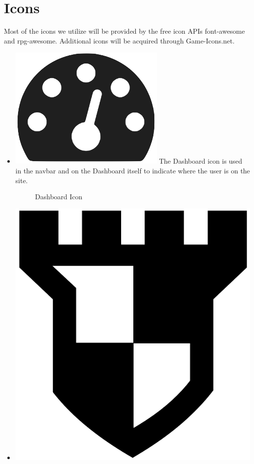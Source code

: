 \documentclass[12pt,a4paper]{report}
\begin{document}
	\section{Icons}
	Most of the icons we utilize will be provided by the free icon APIs font-awesome and rpg-awesome. Additional icons will be acquired through Game-Icons.net.
	\begin{itemize}
		\item \includegraphics[scale=.06]{dashboard_icon}
		The Dashboard icon is used in the navbar and on the Dashboard itself to indicate where the user is on the site.
		\begin{figure}
			\caption{Dashboard Icon}
			\label{fig: Dashboard Icon}
		\end{figure}
		\item \includegraphics[scale=.03]{arena_icon}

\end{itemize}
\end{document}
